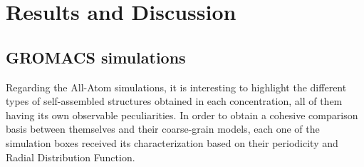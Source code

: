 \documentclass[10pt,a4paper,twoside]{article}
\begin{document}
%
%   
 
\section{Results and Discussion}
\subsection{GROMACS simulations}
Regarding the All-Atom simulations, it is interesting to highlight the different types of self-assembled  structures obtained in each concentration, all of them having its own observable peculiarities. In order to obtain a cohesive comparison basis between themselves and their coarse-grain models, each one of the simulation boxes received its characterization based on their periodicity and Radial Distribution Function.
\end{document}

